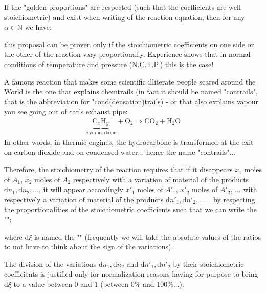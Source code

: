 	
	If the "golden proportions" are respected (such that the coefficients are well stoichiometric) and exist when writing of the reaction equation, then for any $\alpha \in \mathbb{N}$ we have:
	
	this proposal can be proven only if the stoichiometric coefficients on one side or the other of the reaction vary proportionally. Experience shows that in normal conditions of temperature and pressure (N.C.T.P.) this is the case!
	
	\begin{tcolorbox}[title=Remark,arc=10pt,breakable,drop lifted shadow,
  skin=enhanced,
  skin first is subskin of={enhancedfirst}{arc=10pt,no shadow},
  skin middle is subskin of={enhancedmiddle}{arc=10pt,no shadow},
  skin last is subskin of={enhancedlast}{drop lifted shadow}]
	A famous reaction that makes some scientific illiterate people scared around the World is the one that explains chemtrails (in fact it should be named "contrails", that is the abbreviation for "cond(densation)trails) - or that also explains vapour you see going out of car's exhaust pipe:
	\begin{gather*}
		\underbrace{\mathrm{C}_x\mathrm{H}_y}_{\text{Hydrocarbone}}+\mathrm{O}_2 \Rightarrow \mathrm{C}\mathrm{O}_2+\mathrm{H}_2\mathrm{O}
	\end{gather*}
	In other words, in thermic engines, the hydrocarbone is transformed at the exit on carbon dioxide and on condensed water... hence the name "contrails"...
	\end{tcolorbox}
	
	Therefore, the stoichiometry of the reaction requires that if it disappears $x_1$ moles of $A_1$, $x_2$ moles of $A_2$  respectively with a variation of material of the products $\mathrm{d}n_1,\mathrm{d}n_2,\ldots $, it will appear accordingly ${x'}_1$ moles of ${A'}_1$, ${x'}_2$ moles of ${A'}_2$, ... with respectively a variation of material of the products $\mathrm{d}{n'}_1,\mathrm{d}{n'}_2,\ldots $... by respecting the proportionalities of the stoichiometric coefficients such that we can write the "\label{material balance equation}":
	
	where $\mathrm{d}\xi$ is named the "" (frequently we will take the absolute values of the ratios to not have to think about the sign of the variations).
	
	The division of the variations $\mathrm{d}n_1,\mathrm{d}n_2$ and $\mathrm{d}{n'}_1,\mathrm{d}{n'}_2$  by their stoichiometric coefficients is justified only for normalization reasons having for purpose to bring $\mathrm{d}\xi$ to a value between $0$ and $1$ (between $0\%$ and $100\%$...).
	
